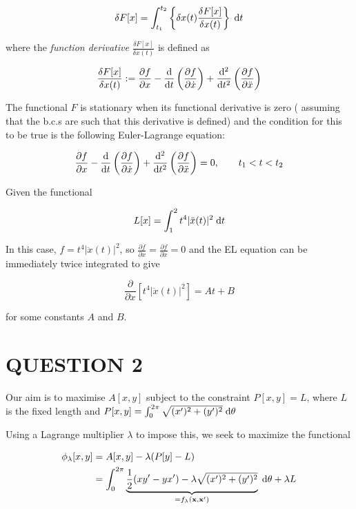 \documentclass[a4paper]{article}
\begin{document}
\[ \delta F[x] = \int_{t_{1}}^{t_{2}} \left\{ \delta x(t) \frac{ \delta F[x]}{\delta x(t)}  \right\}  \; \mathrm{d} t  \]


where the \emph{function derivative} $ \frac{ \delta F[x]}{\delta x(t)} $ is defined as 


\[ \frac{ \delta F[x]}{\delta x(t)} := \frac{\partial f }{\partial x} -  \frac{\mathrm{d} }{\mathrm{d} t} \left(  \frac{\partial f }{\partial \dot{x}} \right)  +  \frac{\mathrm{d}^{2} }{\mathrm{d} t^{2}} \left(  \frac{\partial f }{\partial \ddot{x}} \right)   \]

The functional $ F $ is stationary when its functional derivative is zero ( assuming that the b.c.s are such that this derivative is defined) and the condition for this to be true is the following Euler-Lagrange equation:

\[ \frac{\partial f }{\partial x} -  \frac{\mathrm{d} }{\mathrm{d} t} \left(  \frac{\partial f }{\partial \dot{x}} \right)  +  \frac{\mathrm{d}^{2} }{\mathrm{d} t^{2}} \left(  \frac{\partial f }{\partial \ddot{x}} \right) = 0, \qquad t_{1} < t < t_{2} \]


Given the functional

\[ L[x] = \int_{1}^{2} t^{4} |  \ddot{x}(t)  |^{2} \; \mathrm{d} t  \]

In this case, $ f =  t^{4} |  \ddot{x}(t)  |^{2}  $, so $   \frac{\partial f }{\partial x} = \frac{\partial f }{\partial \dot{x}} = 0 $ and the EL equation can be immediately twice integrated to give 

\[ \frac{\partial }{\partial \ddot{x}} \left[ t^{4} |  \ddot{x}(t)  |^{2}  \right] = At + B   \]

for some constants $ A $ and $ B $.


\section{QUESTION 2}


Our aim is to maximise $ A[x,y] $ subject to the constraint $ P[x,y] = L $, where $ L $ is the fixed length and $ P[x,y] = \int_{0}^{2\pi} \sqrt{  (x')^{2}  + (y')^{2} } \; \mathrm{d} \theta  $

Using a Lagrange multiplier $ \lambda $ to impose this, we seek to maximize the functional

\begin{align*}
\phi_{\lambda}[x,y]  & = A[x,y] - \lambda ( P[y] - L )  \\
& = \int_{0}^{2 \pi} \underbrace{\frac{1}{2} ( xy' - yx' ) - \lambda \sqrt{  (x')^{2}  + (y')^{2} }}_{=f_{\lambda}(\mathbf{x},\mathbf{x}')} \; \mathrm{d} \theta + \lambda L
\end{align*}
\end{document}
